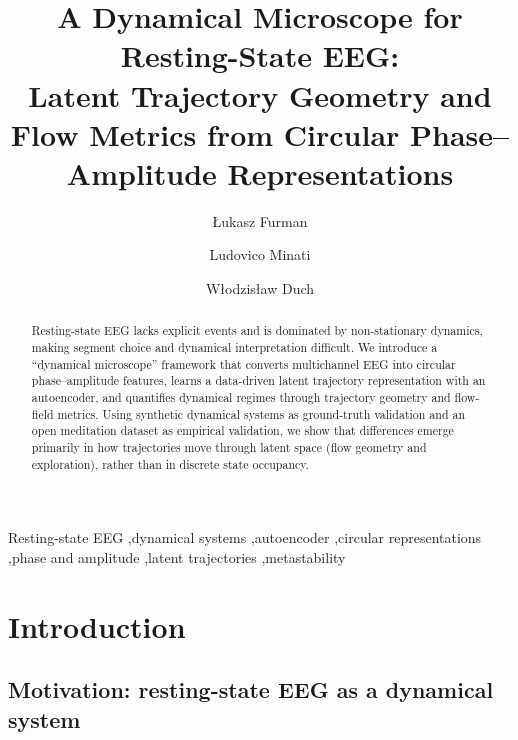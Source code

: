 \documentclass[5p,twocolumn,authoryear]{elsarticle}
\begin{document}
\begin{frontmatter}

\title{A Dynamical Microscope for Resting-State EEG:\\
Latent Trajectory Geometry and Flow Metrics from Circular Phase--Amplitude Representations}

\author[1]{Łukasz Furman}
\author[2,3]{Ludovico Minati}
\author[1]{Włodzisław Duch}

\address[1]{Faculty of Physics, Astronomy and Informatics, Nicolaus Copernicus University, 87-100, Toruń, Poland}
\address[2]{School of Life Science and Technology, University of Electronic Science and Technology of China, 611731 Chengdu, China}
\address[3]{Center for Mind/Brain Sciences (CIMeC), University of Trento, 38123 Trento, Italy}


\begin{abstract}
Resting-state EEG lacks explicit events and is dominated by non-stationary dynamics, making segment choice and dynamical interpretation difficult.
We introduce a ``dynamical microscope'' framework that converts multichannel EEG into circular phase--amplitude features, learns a data-driven latent trajectory representation with an autoencoder, and quantifies dynamical regimes through trajectory geometry and flow-field metrics.
Using synthetic dynamical systems as ground-truth validation and an open meditation dataset as empirical validation, we show that differences emerge primarily in how trajectories move through latent space (flow geometry and exploration), rather than in discrete state occupancy.
\end{abstract}

\begin{keyword}
Resting-state EEG \sep dynamical systems \sep autoencoder \sep circular representations \sep phase and amplitude \sep latent trajectories \sep metastability
\end{keyword}

\end{frontmatter}

\section{Introduction}

\subsection{Motivation: resting-state EEG as a dynamical system}
\end{document}

